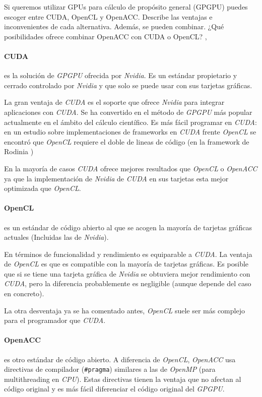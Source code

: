 \begin{pregunta}{Si queremos utilizar GPUs para cálculo de propósito general (GPGPU)
    puedes escoger entre CUDA, OpenCL y OpenACC. Describe las ventajas e
    inconvenientes de cada alternativa.  Además, se pueden combinar. ¿Qué
posibilidades ofrece combinar OpenACC con CUDA o OpenCL?} \sep{}

\paragraph{CUDA} es la solución de \emph{GPGPU} ofrecida por \emph{Nvidia}.
Es un estándar propietario y cerrado controlado por \emph{Nvidia} y que solo se
puede usar con sus tarjetas gráficas. \cite{noauthor_cuda_2017}

La gran ventaja de \emph{CUDA} es el soporte que ofrece \emph{Nvidia} para
integrar aplicaciones con \emph{CUDA}. Se ha convertido en el método de
\emph{GPGPU} más popular actualmente en el ámbito del cálculo científico.
Es más fácil programar en \emph{CUDA}: en un estudio sobre implementaciones
de frameworks en \emph{CUDA} frente \emph{OpenCL} se encontró que \emph{OpenCL}
requiere el doble de lineas de código (en la
framework de Rodinia
\cite{memeti_benchmarking_2017,university_of_virginia_rodinia_nodate} )

En la mayoría de casos \emph{CUDA} ofrece mejores resultados que \emph{OpenCL} o
\emph{OpenACC} ya que la implementación de \emph{Nvidia} de \emph{CUDA} en sus
tarjetas esta mejor optimizada que \emph{OpenCL}.

\paragraph{OpenCL} es un estándar de código abierto al que se acogen la mayoría
de tarjetas gráficas actuales (Incluidas las de \emph{Nvidia}).
\cite{noauthor_opencl_2013}

En términos de funcionalidad y rendimiento es equiparable a \emph{CUDA}. La
ventaja de \emph{OpenCL} es que es compatible con la mayoría de tarjetas
gráficas. Es posible que si se tiene una tarjeta gráfica de \emph{Nvidia}
se obtuviera mejor rendimiento con \emph{CUDA}, pero la diferencia
probablemente es negligible (aunque depende del caso en concreto).

La otra desventaja ya se ha comentado antes, \emph{OpenCL} suele ser más
complejo para el programador que \emph{CUDA}.


\paragraph{OpenACC} es otro estándar de código abierto. A diferencia de
\emph{OpenCL}, \emph{OpenACC} usa directivas de compilador (\texttt{\#pragma})
similares a las de \emph{OpenMP} (para multithreading en \emph{CPU}). Estas
directivas tienen la ventaja que no afectan al código original y es más fácil
diferenciar el código original del \emph{GPGPU}.
\cite{noauthor_about_nodate}


\end{pregunta}
